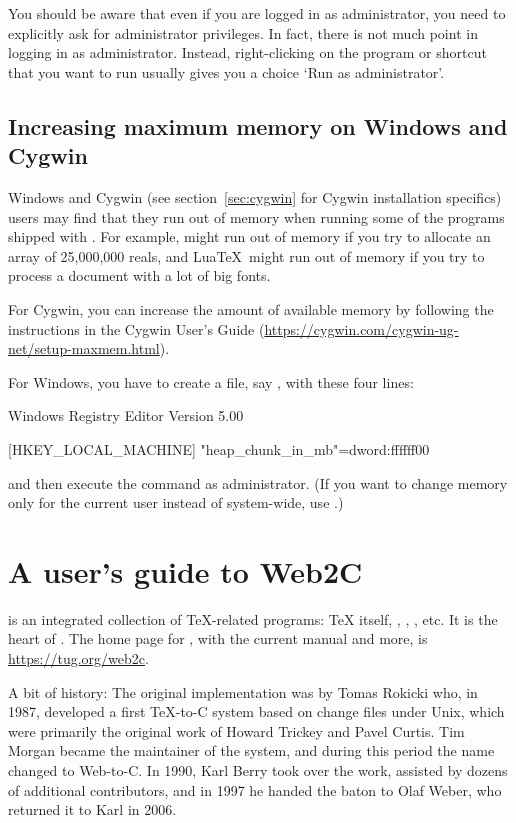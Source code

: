 \documentclass[12pt]{article}
\begin{document}
You should be aware that even if you are logged in as administrator, you
need to explicitly ask for administrator privileges. In fact, there is
not much point in logging in as administrator. Instead, right-clicking
on the program or shortcut that you want to run usually gives you a
choice `Run as administrator'.


\subsection{Increasing maximum memory on Windows and Cygwin}
\label{sec:cygwin-maxmem}

Windows and Cygwin (see section~\ref{sec:cygwin} for Cygwin installation
specifics) users may find that they run out of memory when running some
of the programs shipped with \TL.  For example,  might run out
of memory if you try to allocate an array of 25,000,000 reals, and
Lua\TeX\ might run out of memory if you try to process a document with a
lot of big fonts.

For Cygwin, you can increase the amount of available memory by following
the instructions in the Cygwin User's Guide
(\url{https://cygwin.com/cygwin-ug-net/setup-maxmem.html}).

For Windows, you have to create a file, say , with
these four lines:

\begin{sverbatim}
Windows Registry Editor Version 5.00

[HKEY_LOCAL_MACHINE\Software\Cygwin]
"heap_chunk_in_mb"=dword:ffffff00
\end{sverbatim}

\noindent and then execute the command  as
administrator.  (If you want to change memory only for the current user
instead of system-wide, use .)


\section{A user's guide to Web2C}

\Webc{} is an integrated collection of \TeX-related programs: \TeX{}
itself, \MF{}, \MP, \BibTeX{}, etc.  It is the heart of \TL{}.  The home
page for \Webc{}, with the current manual and more, is
\url{https://tug.org/web2c}.

A bit of history: The original implementation was by Tomas Rokicki who,
in 1987, developed a first \TeX{}-to-C system based on change files
under Unix, which were primarily the original work of Howard Trickey and
Pavel Curtis.  Tim Morgan became the maintainer of the system, and
during this period the name changed to Web-to-C\@.  In 1990, Karl Berry
took over the work, assisted by dozens of additional contributors, and
in 1997 he handed the baton to Olaf Weber, who returned it to Karl in
2006.
\end{document}
